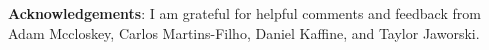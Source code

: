 \documentclass{article}
\begin{document}
\begin{comment}
$T_0 = 50$, $T_1 = 200$ & 0.808 & 0.890 & 0.934 
& 0.697 & 0.795 & 0.872\\
$T_0 = 100$, $T_1 = 200$ & 0.809 & 0.894 & 0.946 
& 0.751 & 0.852 & 0.910 \\
$T_0 = 200$, $T_1 = 200$ & 0.852 & 0.931 & 0.965 
& 0.793 & 0.888 & 0.940  \\

\hline 
\multicolumn{6}{l}{\textbf{$\frac{m}{T_0} = .6$}} \\                                 \midrule
$T_0 = 50$,$T_1 = 50$ & 0.513 & 0.626 & 0.705 
& 0.529 & 0.643 & 0.716 \\
$T_0 = 100$,$T_1 = 50$ & 0.531 & 0.650 & 0.757
& 0.521 & 0.657 & 0.752 \\
$T_0 = 200$,$T_1 = 50$ & 0.584 & 0.721 & 0.807
& 0.599 & 0.717 & 0.802 \\

$T_0 = 50$, $T_1 = 200$ & 0.680 & 0.791 & 0.865
& 0.648 & 0.759 & 0.835  \\
$T_0 = 100$, $T_1 = 200$ & 0.724 & 0.826 & 0.897
& 0.697 & 0.801 & 0.886  \\
$T_0 = 200$, $T_1 = 200$ & 0.789 & 0.889 & 0.947
& 0.760 & 0.865 & 0.929 \\

\hline
\end{tabular}
\begin{tablenotes}
      \small
      \item Notes: All simulations are done with a thousand replications. 
\end{tablenotes}
    \end{threeparttable}}
\end{table}
\end{comment}

\FloatBarrier
\noindent
\textbf{Acknowledgements}: I am grateful for helpful comments and feedback from Adam Mccloskey, Carlos Martins-Filho, Daniel Kaffine, and Taylor Jaworski.

\footnotesize
%


\end{document}

